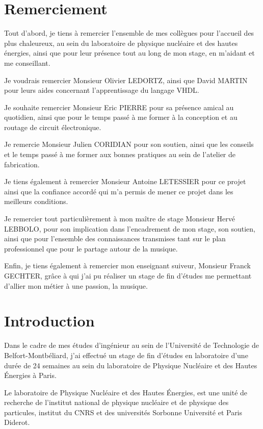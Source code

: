 \documentclass[french,a4paper,12pt]{report}
\begin{document}
  \chapter{Remerciement}
  Tout d'abord, je tiens à remercier l'ensemble de mes collègues pour l'accueil des plus chaleureux, au sein du laboratoire de physique nucléaire et des hautes énergies, ainsi que pour leur présence tout au long de mon stage, en m'aidant et me conseillant.
  
  Je voudrais remercier Monsieur Olivier LEDORTZ, ainsi que David MARTIN pour leurs aides concernant l'apprentissage du langage VHDL.
  
  Je souhaite remercier Monsieur Eric PIERRE pour sa présence amical au quotidien, ainsi que pour le temps passé à me former à la conception et au routage de circuit électronique.
  
  Je remercie Monsieur Julien CORIDIAN pour son soutien, ainsi que les conseils et le temps passé à me former aux bonnes pratiques au sein de l'atelier de fabrication.
  
  Je tiens également à remercier Monsieur Antoine LETESSIER pour ce projet ainsi que la confiance accordé qui m'a permis de mener ce projet dans les meilleurs conditions.
  
  Je remercier tout particulièrement à mon maître de stage Monsieur Hervé LEBBOLO, pour son implication dans l'encadrement de mon stage, son soutien, ainsi que pour l'ensemble des connaissances transmises tant sur le plan professionnel que pour le partage autour de la musique.
  
  Enfin, je tiens également à remercier mon enseignant suiveur, Monsieur Franck GECHTER, grâce à qui j'ai pu réaliser un stage de fin d'études me permettant d'allier mon métier à une passion, la musique.
  
 \chapter{Introduction}

Dans le cadre de mes études d'ingénieur au sein de l'Université de Technologie de Belfort-Montbéliard, j'ai effectué un stage de fin d'études en laboratoire d'une durée de 24 semaines au sein du laboratoire de Physique Nucléaire et des Hautes Énergies à Paris.

Le laboratoire de Physique Nucléaire et des Hautes Énergies, est une unité de recherche de l'institut national de  physique nucléaire et de physique des particules, institut du CNRS et des universités Sorbonne Université et Paris Diderot.
\end{document}
